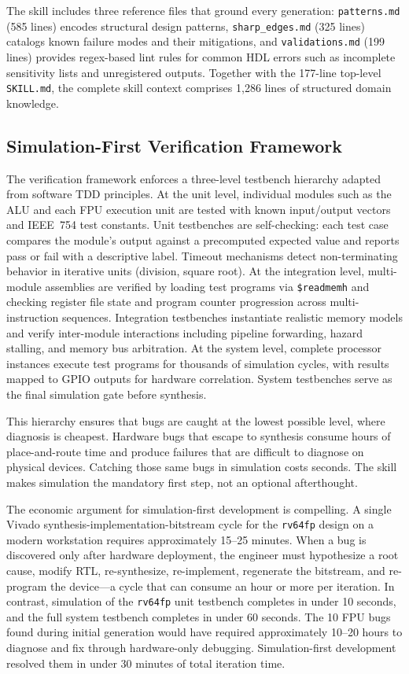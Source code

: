 \documentclass[journal]{IEEEtran}
\begin{document}
The skill includes three reference files that ground every generation:
\texttt{patterns.md} (585 lines) encodes structural design patterns,
\texttt{sharp\_edges.md} (325 lines) catalogs known failure modes and
their mitigations, and \texttt{validations.md} (199 lines) provides
regex-based lint rules for common HDL errors such as incomplete
sensitivity lists and unregistered outputs.  Together with the
177-line top-level \texttt{SKILL.md}, the complete skill context
comprises 1,286 lines of structured domain knowledge.

\subsection{Simulation-First Verification Framework}
\label{sec:simfirst}

The verification framework enforces a three-level testbench hierarchy
adapted from software TDD principles.  At the unit level, individual
modules such as the ALU and each FPU execution unit are tested with known
input/output vectors and IEEE~754 test constants.  Unit testbenches are
self-checking: each test case compares the module's output against a
precomputed expected value and reports pass or fail with a descriptive
label.  Timeout mechanisms detect non-terminating behavior in iterative
units (division, square root).  At the integration level, multi-module
assemblies are verified by loading test programs via
\texttt{\$readmemh} and checking register file state and program counter
progression across multi-instruction sequences.  Integration testbenches
instantiate realistic memory models and verify inter-module interactions
including pipeline forwarding, hazard stalling, and memory bus
arbitration.  At the system level, complete processor instances execute
test programs for thousands of simulation cycles, with results mapped to
GPIO outputs for hardware correlation.  System testbenches serve as the
final simulation gate before synthesis.

This hierarchy ensures that bugs are caught at the lowest possible level,
where diagnosis is cheapest.  Hardware bugs that escape to synthesis
consume hours of place-and-route time and produce failures that are
difficult to diagnose on physical devices.  Catching those same bugs in
simulation costs seconds.  The skill makes simulation the mandatory first
step, not an optional afterthought.

The economic argument for simulation-first development is
compelling.  A single Vivado synthesis-implementation-bitstream cycle for
the \texttt{rv64fp} design on a modern workstation requires approximately
15--25 minutes.  When a bug is discovered only after hardware deployment,
the engineer must hypothesize a root cause, modify RTL, re-synthesize,
re-implement, regenerate the bitstream, and re-program the device---a
cycle that can consume an hour or more per iteration.  In contrast,
simulation of the \texttt{rv64fp} unit testbench completes in under 10
seconds, and the full system testbench completes in under 60 seconds.
The 10 FPU bugs found during initial generation would have required
approximately 10--20 hours to diagnose and fix through hardware-only
debugging.  Simulation-first development resolved them in under 30
minutes of total iteration time.
\end{document}
